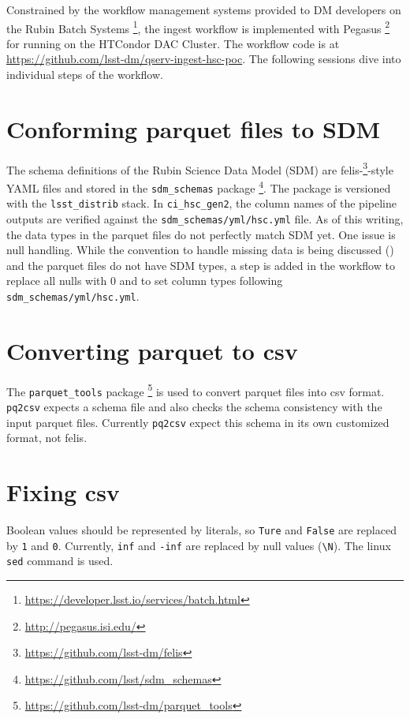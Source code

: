 Constrained by the workflow management systems provided to DM developers on the Rubin Batch Systems \footnote{\url{https://developer.lsst.io/services/batch.html}}, the ingest workflow is implemented with Pegasus \footnote{\url{http://pegasus.isi.edu/}} for running on the HTCondor DAC Cluster.
The workflow code is at \url{https://github.com/lsst-dm/qserv-ingest-hsc-poc}.
The following sessions dive into individual steps of the workflow.


\section{Conforming parquet files to SDM}
The schema definitions of the Rubin Science Data Model (SDM) are felis-\footnote{\url{https://github.com/lsst-dm/felis}}-style YAML files and stored in the \texttt{sdm\_schemas} package \footnote{\url{https://github.com/lsst/sdm\_schemas}}.
The package is versioned with the \texttt{lsst\_distrib} stack.
In \texttt{ci\_hsc\_gen2}, the column names of the pipeline outputs are verified against the \texttt{sdm\_schemas/yml/hsc.yml} file.
As of this writing, the data types in the parquet files do not perfectly match SDM yet.
One issue is null handling.
While the convention to handle missing data is being discussed () and the parquet files do not have SDM types, a step is added in the workflow to replace all nulls with 0 and to set column types following \texttt{sdm\_schemas/yml/hsc.yml}.


\section{Converting parquet to csv}
The \texttt{parquet\_tools} package \footnote{\url{https://github.com/lsst-dm/parquet\_tools}} is used to convert parquet files into csv format.
\texttt{pq2csv} expects a schema file and also checks the schema consistency with the input parquet files.
Currently \texttt{pq2csv} expect this schema in its own customized format, not felis.


\section{Fixing csv}
Boolean values should be represented by literals, so \texttt{Ture} and \texttt{False} are replaced by \texttt{1} and \texttt{0}.
Currently, \texttt{inf} and \texttt{-inf} are replaced by null values (\texttt{\textbackslash N}).
The linux \texttt{sed} command is used.


